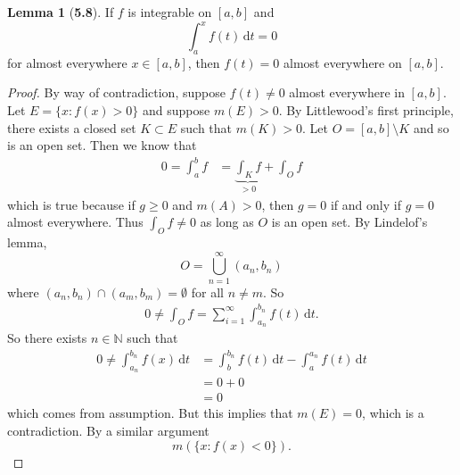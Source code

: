 \documentclass[12pt]{article}
\newcommand{\N}{\mathbb{N}}
\newcommand{\dif}{\, \mathrm{d}}
\theoremstyle{definition}
\newtheorem*{lemma}{Lemma}
\begin{document}
\begin{lemma}[\textbf{5.8}]

    If \( f \) is integrable on \( [a,b] \) and
        \[
            \int_{a}^{x} f(t) \dif t = 0 
        \]
    for almost everywhere \( x \in [a,b] \), then \( f(t) = 0 \) almost everywhere on \( [a,b] \).

        \begin{proof}
            By way of contradiction, suppose \( f(t) \neq 0 \) almost everywhere in \( [a,b] \). Let \( E = \{ x: f(x) > 0 \} \) and suppose \( m(E) > 0 \). By Littlewood's first principle, there exists a closed set \( K \subset E\) such that \( m(K) > 0 \). Let \( O = [a,b] \setminus K \) and so is an open set. Then we know that    
                \begin{align*}
                    0  = \int_{a}^{b} f &= \underbrace{\int_{K} f}_{> 0} + \int_{O} f 
                \end{align*}
            which is true because if \( g \geq 0 \) and \( m(A) > 0 \), then \( \displaystyle g = 0 \) if and only if \( g = 0 \) almost everywhere. 
            Thus \( \displaystyle \int_{O} f \neq 0 \) as long as \( O \) is an open set. By Lindelof's lemma, 
                \[
                    O = \bigcup_{n=1}^{\infty} (a_n, b_n)  
                \]
            where \( (a_n, b_n) \cap (a_m, b_m) = \emptyset \) for all \( n \neq m \). So
                \begin{align*}
                    0 \neq \int_{O} f = \sum_{i=1}^{\infty} \int_{a_n}^{b_n} f(t) \dif t.
                \end{align*}
            So there exists \( n \in \N \) such that 
                \begin{align*}
                    0 \neq \int_{a_n}^{b_n} f(x) \dif t &= \int_{b}^{b_n}f(t) \dif t - \int_{a}^{a_n} f(t) \dif t \\
                    &= 0 + 0 \\
                    &= 0
                \end{align*}
            which comes from assumption. But this implies that \( m(E) = 0 \), which is a contradiction. By a similar argument
                \[
                    m\left( \{ x: f(x) < 0 \} \right).
                \]
        \end{proof}
    
\end{lemma}
\end{document}
